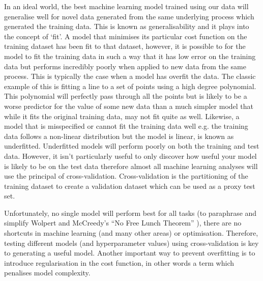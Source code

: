 In an ideal world, the best machine learning model trained using our data will generalise well for novel data generated from the same underlying process
which generated the training data.  This is known as generalisability and it plays into the concept of `fit'.  A model that minimises %
its particular cost function on the training dataset has been fit to that dataset, however, it is possible to for the model to fit the training
data in such a way that it has low error on the training data but performs incredibly poorly when applied to new data from the same process.
This is typically the case when a model has overfit the data.  The classic example of this is fitting a line to a set of points using a %
high degree polynomial.  This polynomial will perfectly pass through all the points but is likely to be a worse predictor for the value %
of some new data than a much simpler model that while it fits the original training data, may not fit quite as well.  Likewise, a model that is misspecified
or cannot fit the training data well e.g. the training data follows a non-linear distribution but the model is linear, is known as underfitted.
Underfitted models will perform poorly on both the training and test data.  However, it isn't particularly useful to only discover
how useful your model is likely to be on the test data therefore almost all machine learning analyses will use the principal of cross-validation. %
Cross-validation is the partitioning of the training dataset to create a validation dataset which can be used as a proxy test set.

Unfortunately, no single model will perform best for all tasks (to paraphrase and simplify Wolpert and McCreedy's ``No Free Lunch Theorem'' \citep{Wolpert1996}),
there are no shortcuts in machine learning (and many other areas) or optimisation.  Therefore, testing different models (and hyperparameter values) using
cross-validation is key to generating a useful model.  Another important way to prevent overfitting is to introduce regularisation in the cost function, in other
words a term which penalises model complexity. %

